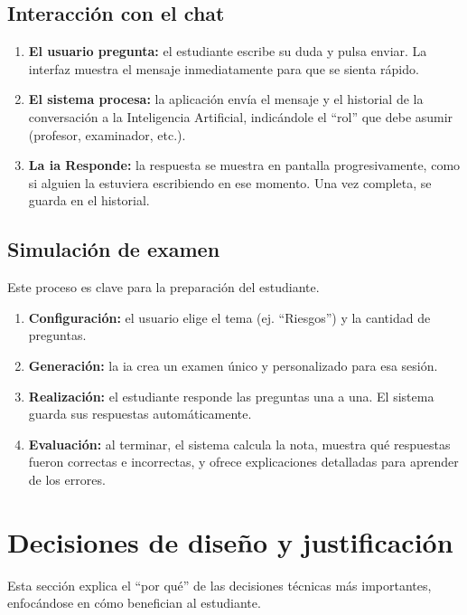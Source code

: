 \subsection{Interacción con el chat}
\begin{enumerate}
\item \textbf{El usuario pregunta:} el estudiante escribe su duda y pulsa enviar. La interfaz muestra el mensaje inmediatamente para que se sienta rápido.
\item \textbf{El sistema procesa:} la aplicación envía el mensaje y el historial de la conversación a la Inteligencia Artificial, indicándole el \enquote{rol} que debe asumir (profesor, examinador, etc.).
\item \textbf{La \gls{ia} Responde:} la respuesta se muestra en pantalla progresivamente, como si alguien la estuviera escribiendo en ese momento. Una vez completa, se guarda en el historial.
\end{enumerate}

\subsection{Simulación de examen}
Este proceso es clave para la preparación del estudiante.
\begin{enumerate}
\item \textbf{Configuración:} el usuario elige el tema (ej. \enquote{Riesgos}) y la cantidad de preguntas.
\item \textbf{Generación:} la \gls{ia} crea un examen único y personalizado para esa sesión.
\item \textbf{Realización:} el estudiante responde las preguntas una a una. El sistema guarda sus respuestas automáticamente.
\item \textbf{Evaluación:} al terminar, el sistema calcula la nota, muestra qué respuestas fueron correctas e incorrectas, y ofrece explicaciones detalladas para aprender de los errores.
\end{enumerate}

\section{Decisiones de diseño y justificación}

Esta sección explica el \enquote{por qué} de las decisiones técnicas más importantes, enfocándose en cómo benefician al estudiante.

